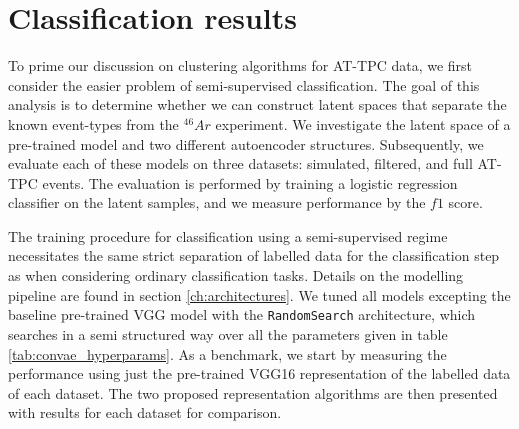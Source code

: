 \chapter{Classification results}\label{chap:classification}

To prime our discussion on clustering algorithms for AT-TPC data, we first consider the easier problem of semi-supervised classification. The goal of this analysis is to determine whether we can construct latent spaces that separate the known event-types from the ${}^{46}Ar$ experiment. We investigate the latent space of a pre-trained model and two different autoencoder structures. Subsequently, we evaluate each of these models on three datasets: simulated, filtered, and full AT-TPC events. The evaluation is performed by training a logistic regression classifier on the latent samples, and we measure performance by the $f1$ score. 

The training procedure for classification using a semi-supervised regime necessitates the same strict separation of labelled data for the classification step as when considering ordinary classification tasks. Details on the modelling pipeline are found in section \ref{ch:architectures}. We tuned all models excepting the baseline pre-trained VGG model with the \lstinline{RandomSearch} architecture, which searches in a semi structured way over all the parameters given in table \ref{tab:convae_hyperparams}. As a benchmark, we start by measuring the performance using just the pre-trained VGG16 representation of the labelled data of each dataset. The two proposed representation algorithms are then presented with results for each dataset for comparison. 
